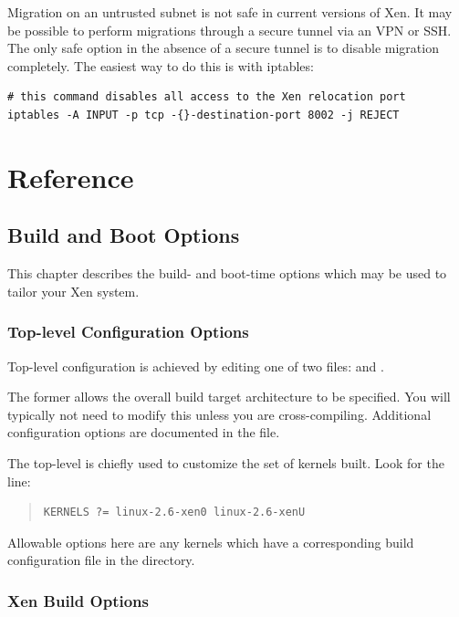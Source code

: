 \documentclass[11pt,twoside,final,openright]{report}
\begin{document}
Migration on an untrusted subnet is not safe in current versions of Xen.
It may be possible to perform migrations through a secure tunnel via an
VPN or SSH. The only safe option in the absence of a secure tunnel is to
disable migration completely. The easiest way to do this is with
iptables:

\begin{verbatim}
# this command disables all access to the Xen relocation port
iptables -A INPUT -p tcp -{}-destination-port 8002 -j REJECT
\end{verbatim}

\part{Reference}

\chapter{Build and Boot Options} 

This chapter describes the build- and boot-time options which may be
used to tailor your Xen system.

\section{Top-level Configuration Options} 

Top-level configuration is achieved by editing one of two 
files:  and . 

The former allows the overall build target architecture to be 
specified. You will typically not need to modify this unless 
you are cross-compiling. Additional configuration options are
documented in the  file. 

The top-level  is chiefly used to customize the set of
kernels built. Look for the line: 
\begin{quote}
\begin{verbatim}
KERNELS ?= linux-2.6-xen0 linux-2.6-xenU
\end{verbatim}
\end{quote}

Allowable options here are any kernels which have a corresponding 
build configuration file in the  directory. 



\section{Xen Build Options}
\end{document}
